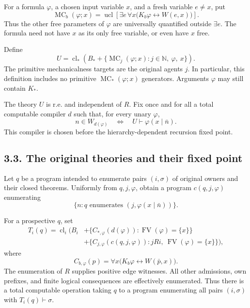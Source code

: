 \documentclass[
  11pt,
  letterpaper,
]{article}
\begin{document}
For a formula \(\varphi\), a chosen input variable \(x\), and a fresh
variable \(e\ne x\), put \[
\operatorname{MC}_b(\varphi;x)=
\operatorname{ucl}\left[
\exists e\,\forall x
 \bigl(K_b\varphi\leftrightarrow W(e,x)\bigr)\right].
\tag{S2}
\] Thus the other free parameters of \(\varphi\) are universally
quantified outside \(\exists e\). The formula need not have \(x\) as its
only free variable, or even have \(x\) free.

Define \[
U=
\operatorname{cl}_*\left(
 B_*+
 \{\operatorname{MC}_j(\varphi;x):
                  j\in\mathbb N,\ \varphi,\ x\}
 \right).
\tag{S3}
\] The primitive mechanicalness targets are the original agents \(j\).
In particular, this definition includes no primitive
\(\operatorname{MC}_*(\varphi;x)\) generators. Arguments \(\varphi\) may
still contain \(K_*\).

The theory \(U\) is r.e. and independent of \(R\). Fix once and for all
a total computable compiler \(d\) such that, for every unary
\(\varphi\), \[
n\in W_{d(\varphi)}
\quad\Longleftrightarrow\quad
U\vdash\varphi(x\mid\bar n).
\tag{S4}
\] This compiler is chosen before the hierarchy-dependent recursion
fixed point.

\subsection{3.3. The original theories and their fixed
point}\label{the-original-theories-and-their-fixed-point}

Let \(q\) be a program intended to enumerate pairs \((i,\sigma)\) of
original owners and their closed theorems. Uniformly from
\(q,j,\varphi\), obtain a program \(c(q,j,\varphi)\) enumerating \[
\{n:q\text{ enumerates }(j,\varphi(x\mid\bar n))\}.
\]

For a prospective \(q\), set \[
\begin{split}
T_i(q)=\operatorname{cl}_i\bigl(
 B_i
 &+\{C_{*,\varphi}(d(\varphi)):\operatorname{FV}(\varphi)=\{x\}\}\\
 &+\{C_{j,\varphi}(c(q,j,\varphi)):
                    jRi,\ \operatorname{FV}(\varphi)=\{x\}\}
\bigr),
\end{split}
\tag{S5}
\] where \[
C_{b,\varphi}(p)=
\forall x\bigl(K_b\varphi\leftrightarrow W(\bar p,x)\bigr).
\tag{S6}
\] The enumeration of \(R\) supplies positive edge witnesses. All other
admissions, own prefixes, and finite logical consequences are
effectively enumerated. Thus there is a total computable operation
taking \(q\) to a program enumerating all pairs \((i,\sigma)\) with
\(T_i(q)\vdash\sigma\).
\end{document}
